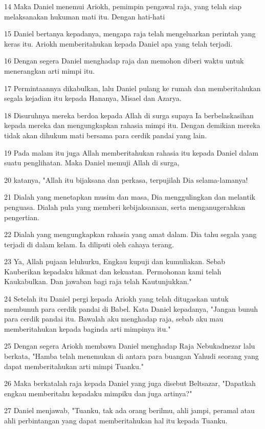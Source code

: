 \par 14 Maka Daniel menemui Ariokh, pemimpin pengawal raja, yang telah siap melaksanakan hukuman mati itu. Dengan hati-hati
\par 15 Daniel bertanya kepadanya, mengapa raja telah mengeluarkan perintah yang keras itu. Ariokh memberitahukan kepada Daniel apa yang telah terjadi.
\par 16 Dengan segera Daniel menghadap raja dan memohon diberi waktu untuk menerangkan arti mimpi itu.
\par 17 Permintaannya dikabulkan, lalu Daniel pulang ke rumah dan memberitahukan segala kejadian itu kepada Hananya, Misael dan Azarya.
\par 18 Disuruhnya mereka berdoa kepada Allah di surga supaya Ia berbelaskasihan kepada mereka dan mengungkapkan rahasia mimpi itu. Dengan demikian mereka tidak akan dihukum mati bersama para cerdik pandai yang lain.
\par 19 Pada malam itu juga Allah memberitahukan rahasia itu kepada Daniel dalam suatu penglihatan. Maka Daniel memuji Allah di surga,
\par 20 katanya, "Allah itu bijaksana dan perkasa, terpujilah Dia selama-lamanya!
\par 21 Dialah yang menetapkan musim dan masa, Dia menggulingkan dan melantik penguasa. Dialah pula yang memberi kebijaksanaan, serta menganugerahkan pengertian.
\par 22 Dialah yang mengungkapkan rahasia yang amat dalam. Dia tahu segala yang terjadi di dalam kelam. Ia diliputi oleh cahaya terang.
\par 23 Ya, Allah pujaan leluhurku, Engkau kupuji dan kumuliakan. Sebab Kauberikan kepadaku hikmat dan kekuatan. Permohonan kami telah Kaukabulkan. Dan jawaban bagi raja telah Kautunjukkan."
\par 24 Setelah itu Daniel pergi kepada Ariokh yang telah ditugaskan untuk membunuh para cerdik pandai di Babel. Kata Daniel kepadanya, "Jangan bunuh para cerdik pandai itu. Bawalah aku menghadap raja, sebab aku mau memberitahukan kepada baginda arti mimpinya itu."
\par 25 Dengan segera Ariokh membawa Daniel menghadap Raja Nebukadnezar lalu berkata, "Hamba telah menemukan di antara para buangan Yahudi seorang yang dapat memberitahukan arti mimpi Tuanku."
\par 26 Maka berkatalah raja kepada Daniel yang juga disebut Beltsazar, "Dapatkah engkau memberitahu kepadaku mimpiku dan juga artinya?"
\par 27 Daniel menjawab, "Tuanku, tak ada orang berilmu, ahli jampi, peramal atau ahli perbintangan yang dapat memberitahukan hal itu kepada Tuanku.
